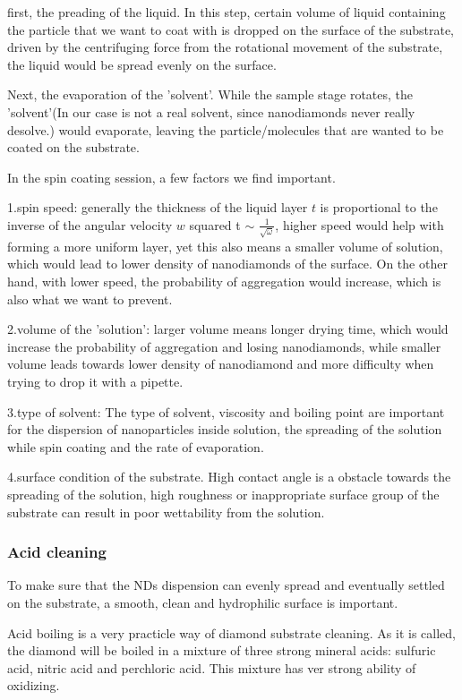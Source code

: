 first, the preading of the liquid. In this step, certain volume of liquid containing the particle that we want to coat with is dropped on the surface of the substrate, driven by the centrifuging force from the rotational movement of the substrate, the liquid would be spread evenly on the surface.

Next, the evaporation of the 'solvent'. While the sample stage rotates, the 'solvent'(In our case is not a real solvent, since nanodiamonds never really desolve.) would evaporate, leaving the particle/molecules that are wanted to be coated on the substrate.

In the spin coating session, a few factors we find important.

1.spin speed: generally the thickness of the liquid layer $t$ is proportional to the inverse of the angular velocity $w$ squared t $\sim$ $\frac{1}{\sqrt{\omega}}$, higher speed would help with forming a more uniform layer, yet this also means a smaller volume of solution, which would lead to lower density of nanodiamonds of the surface. On the other hand, with lower speed, the probability of aggregation would increase, which is also what we want to prevent.

2.volume of the 'solution': larger volume means longer drying time, which would increase the probability of aggregation and losing nanodiamonds, while smaller volume leads towards lower density of nanodiamond and more difficulty when trying to drop it with a pipette. 

3.type of solvent: The type of solvent, viscosity and boiling point are important for the dispersion of nanoparticles inside solution, the spreading of the solution while spin coating and the rate of evaporation.

4.surface condition of the substrate. High contact angle is a obstacle towards the spreading of the solution, high roughness or inappropriate surface group of the substrate can result in poor wettability from the solution.


\subsubsection{Acid cleaning}
To make sure that the NDs dispension can evenly spread and eventually settled on the substrate, a smooth, clean and hydrophilic surface is important.

Acid boiling is a very practicle way of diamond substrate cleaning. As it is called, the diamond will be boiled in a mixture of three strong mineral acids: sulfuric acid, nitric acid and perchloric acid. This mixture has ver strong ability of oxidizing.

